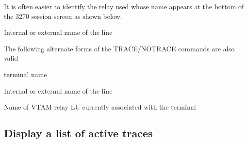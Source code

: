 \documentclass[letterpaper,10pt,english]{sphinxmanual}
\begin{document}
\sphinxAtStartPar
It is often easier to identify the relay used whose name appears at the bottom of the 3270 session screen as shown below.

\sphinxAtStartPar
{}
\begin{description}
\sphinxAtStartPar
Internal or external name of the line

\end{description}

\sphinxAtStartPar
The following alternate forms of the TRACE/NOTRACE commands are also  valid

\begin{sphinxVerbatim}[commandchars=\\\{\}]
  
  
  
  
  
  
\end{sphinxVerbatim}
\begin{description}
\sphinxAtStartPar
terminal name

\sphinxAtStartPar
Internal or external name of the line

\sphinxAtStartPar
Name of VTAM relay LU currently associated with the terminal

\end{description}

\ignorespaces 

\subsection{Display a list of active traces}
\label{\detokenize{audit_operations_ and_performance:display-a-list-of-active-traces}}\label{\detokenize{audit_operations_ and_performance:index-29}}
\begin{sphinxVerbatim}[commandchars=\\\{\}]
  
\end{sphinxVerbatim}
\end{document}
